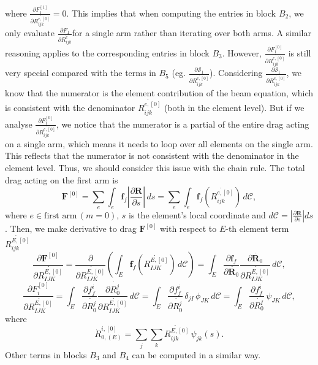 \documentclass[a4paper,12pt]{article}
\begin{document}
where $\frac{\partial F_1^{[1]}}{\partial\dot{R_{ijk}^{e,[0]}}}=0$. This implies that when computing the entries in block $B_2$​, we only evaluate $\frac{\partial F_1}{\partial\dot{R_{ijk}^{e}}}$​​ for a single arm rather than iterating over both arms. A similar reasoning applies to the corresponding entries in block $B_3$. However, $\frac{\partial F_1^{[0]}}{\partial\dot{R_{ijk}^{e,[0]}}}$ is still very special compared with the terms in $B_5$ (eg. $\frac{\partial\mathcal{S}_1}{\partial\dot{R_{ijk}^{e,[0]}}}$). Considering $\frac{\partial\mathcal{S}_1}{\partial\dot{R_{ijk}^{e,[0]}}}$, we know that the numerator is the element contribution of the beam equation, which is consistent with the denominator $\dot{R_{ijk}^{e,[0]}}$ (both in the element level). But if we analyse $\frac{\partial F_1^{[0]}}{\partial\dot{R_{ijk}^{e,[0]}}}$, we notice that the numerator is a partial of the entire drag acting on a single arm, which means it needs to loop over all elements on the single arm. This reflects that the numerator is not consistent with the denominator in the element level. Thus, we should consider this issue with the chain rule. The total drag acting on the first arm is 
\begin{equation}
	\label{eqn:130}
\bm{F}^{[0]}= \sum_e \int_e \bm{f}_f \left|\frac{\partial\textbf{R}}{\partial s}\right|\,ds=\sum_e \int_e \bm{f}_f(\dot{R_{ijk}^{e,[0]}})\,d\mathcal{C},
\end{equation}
where $e \in \text{first arm}\,(m=0)$, $s$ is the element's local coordinate and  $d\mathcal{C}=\left|\frac{\partial\textbf{R}}{\partial s}\right|ds$. Then, we make derivative to drag $\bm{F}^{[0]}$ with respect to $E$-th element term $\dot{R_{ijk}^{E,[0]}}$ 
\begin{equation}
	\label{eqn:131}
	\frac{\partial \bm{F}^{[0]}}{\partial \dot{R_{IJK}^{E,[0]}}}=\frac{\partial}{\partial \dot{R_{IJK}^{E,[0]}}}\left(\int_E \bm{f}_f(\dot{R_{IJK}^{E,[0]}})\,d\mathcal{C}\right)=\int_E\frac{\partial \bm{f}_f}{\partial \dot{\bm{R}_0}} \frac{\partial \dot{\bm{R}_0}}{\partial \dot{R_{IJK}^{E,[0]}}}\,d\mathcal{C},
\end{equation}
\begin{equation}
	\label{eqn:138}
	\frac{\partial F_i^{[0]}}{\partial \dot{R_{IJK}^{E,[0]}}}=\int_E\frac{\partial f_{f}^i}{\partial \dot{R_0^j}} \frac{\partial \dot{R^j_0}}{\partial \dot{R_{IJK}^{E,[0]}}}\,d\mathcal{C}=\int_E\frac{\partial f_{f}^i}{\partial \dot{R_0^j}}\, \delta_{jI}\,\phi_{JK}\,d\mathcal{C}=\int_E\frac{\partial f_{f}^i}{\partial \dot{R_0^I}}\,\psi_{JK}\,d\mathcal{C},
\end{equation}
where 
\begin{equation}
	\label{eqn:132}
	\dot{R}^{i,[0]}_{0,(E)}=\sum_j\sum_k \dot{R_{ijk}^{E,[0]}}\,\psi_{jk}(s).
\end{equation}
Other terms in blocks $B_3$ and $B_4$ can be computed in a similar way.
\end{document}
